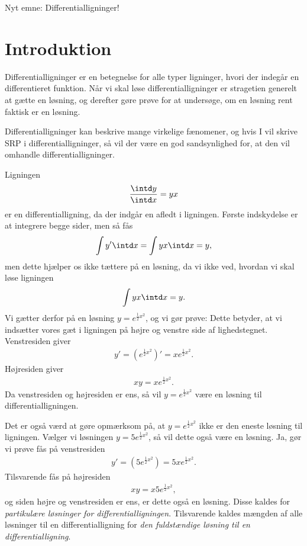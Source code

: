 \begin{center}
\Huge
Nyt emne: Differentialligninger!
\end{center}

\section*{Introduktion}

Differentialligninger er en betegnelse for alle typer ligninger, hvori der indegår en differentieret funktion. Når vi skal løse differentialligninger er stragetien generelt at gætte en løsning, og derefter gøre prøve for at undersøge, om en løsning rent faktisk er en løsning.

Differentialligninger kan beskrive mange virkelige fænomener, og hvis I vil skrive SRP i differentialligninger, så vil der være en god sandsynlighed for, at den vil omhandle differentialligninger. 

\begin{exa}
Ligningen
\begin{align*}
	\frac{\intd y}{\intd x} = yx
\end{align*}
er en differentialligning, da der indgår en afledt i ligningen. Første indskydelse er at integrere begge sider, men så fås
\begin{align*}
	\int y' \intd x =\int yx \intd x = y,
\end{align*}
men dette hjælper os ikke tættere på en løsning, da vi ikke ved, hvordan vi skal løse ligningen
\begin{align*}
	\int y x \intd x = y.
\end{align*}
Vi gætter derfor på en løsning $y = e^{\frac{1}{2}x^2}$, og vi gør prøve: Dette betyder, at vi indsætter vores gæt i ligningen på højre og venstre side af lighedstegnet.
Venstresiden giver
\begin{align*}
	y' = \left(e^{\frac{1}{2}x^2}\right)' = xe^{\frac{1}{2}x^2}.
\end{align*}
Højresiden giver
\begin{align*}
	xy = xe^{\frac{1}{2}x^2}.
\end{align*}
Da venstresiden og højresiden er ens, så vil $y=e^{\frac{1}{2}x^2}$ være en løsning til differentialligningen. 

Det er også værd at gøre opmærksom på, at $y=e^{\frac{1}{2}x^2}$ ikke er den eneste løsning til ligningen. Vælger vi løsningen $y=5e^{\frac{1}{2}x^2}$, så vil dette også være en løsning. Ja, gør vi prøve fås på venstresiden
\begin{align*}
	y' = \left(5e^{\frac{1}{2}x^2}\right) = 5xe^{\frac{1}{2}x^2}.
\end{align*}
Tilsvarende fås på højresiden
\begin{align*}
	xy = x5e^{\frac{1}{2}x^2},
\end{align*}
og siden højre og venstresiden er ens, er dette også en løsning. Disse kaldes for \textit{partikulære løsninger for differentialligningen}. Tilsvarende kaldes mængden af alle løsninger til en differentialligning for \textit{den fuldstændige løsning til en differentialligning}.
\end{exa}

